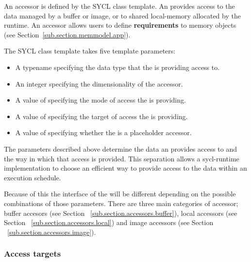 
An \gls{accessor} is defined by the SYCL  class template.
An  provides access to the data managed by a \gls{buffer}
or \gls{image}, or to shared \gls{local-memory} allocated by the runtime. An
\gls{accessor} allows users to define \textbf{requirements} to memory objects
(see Section~\ref{sub.section.memmodel.app}).

The SYCL  class template takes five template parameters:

\begin{itemize}
\item A typename specifying the data type that the  is
providing access to.
\item An integer specifying the dimensionality of the accessor.
\item A value of  specifying the mode of access the
 is providing.
\item A value of  specifying the target of access
the  is providing.
\item A value of  specifying whether the
 is a placeholder accessor.
\end{itemize}

The parameters described above determine the data an 
provides access to and the way in which that access is provided. This separation
allows a \gls{sycl-runtime} implementation to choose an efficient way to provide
access to the data within an execution schedule.

Because of this the interface of the  will
be different depending on the possible combinations of those parameters. There
are three main categories of accessor; buffer accesors (see Section%
~\ref{sub.section.accessors.buffer}), local accessors (see Section%
~\ref{sub.section.accessors.local}) and image accessors (see Section%
~\ref{sub.section.accessors.image}).


\subsubsection{Access targets}
\label{sub.section.access.targets}

